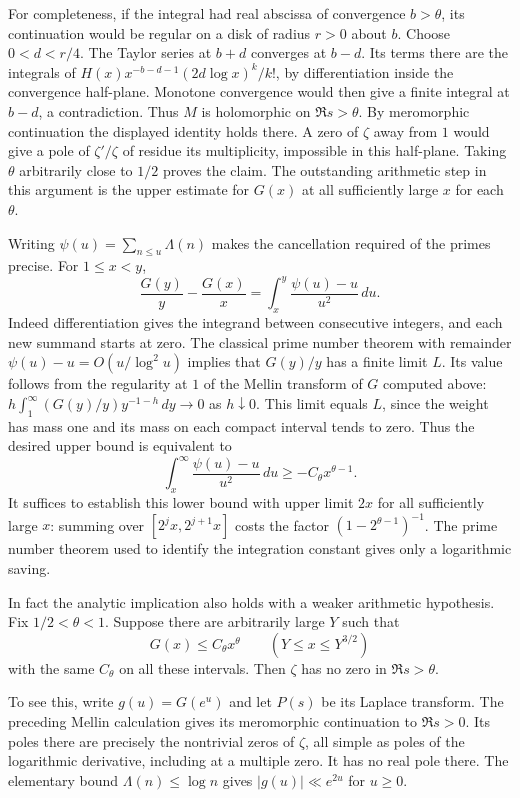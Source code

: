 \documentclass[11pt]{amsart}
\theoremstyle{definition}
\theoremstyle{remark}
\begin{document}
For completeness, if the integral had real abscissa of convergence
$b>\theta$, its continuation would be regular on a disk of radius
$r>0$ about $b$. Choose $0<d<r/4$. The Taylor series at $b+d$
converges at $b-d$. Its terms there are the integrals of
$H(x)x^{-b-d-1}(2d\log x)^k/k!$, by differentiation inside the
convergence half-plane. Monotone convergence would then give a finite
integral at $b-d$, a contradiction. Thus $M$ is holomorphic on
$\Re s>\theta$. By meromorphic continuation the displayed identity
holds there. A zero of $\zeta$ away from $1$ would give a pole of
$\zeta'/\zeta$ of residue its multiplicity, impossible in this
half-plane. Taking $\theta$ arbitrarily close to $1/2$ proves the claim.
The outstanding arithmetic step in this argument is the upper estimate
for $G(x)$ at all sufficiently large $x$ for each $\theta$.


Writing $\psi(u)=\sum_{n\le u}\Lambda(n)$ makes the cancellation
required of the primes precise. For $1\le x<y$,
\[
 \frac{G(y)}y-\frac{G(x)}x=\int_x^y\frac{\psi(u)-u}{u^2}\,du .
\]
Indeed differentiation gives the integrand between consecutive
integers, and each new summand starts at zero. The classical prime
number theorem with remainder $\psi(u)-u=O(u/\log^2 u)$ implies
that $G(y)/y$ has a finite limit $L$. Its value follows from the
regularity at $1$ of the Mellin transform of $G$ computed above:
$h\int_1^\infty (G(y)/y)y^{-1-h}\,dy\to0$ as $h\downarrow0$.
This limit equals $L$, since the weight has mass one and its mass on
each compact interval tends to zero. Thus the desired upper bound
is equivalent to
\[
 \int_x^\infty\frac{\psi(u)-u}{u^2}\,du\ge -C_\theta x^{\theta-1}.
\]
It suffices to establish this lower bound with upper limit $2x$ for
all sufficiently large $x$: summing over $[2^jx,2^{j+1}x]$ costs
the factor $(1-2^{\theta-1})^{-1}$. The prime number theorem used
to identify the integration constant gives only a logarithmic saving.

In fact the analytic implication also holds with a weaker arithmetic
hypothesis. Fix $1/2<\theta<1$. Suppose there are arbitrarily large $Y$
such that
\[
 G(x)\le C_\theta x^\theta\qquad(Y\le x\le Y^{3/2})
\]
with the same $C_\theta$ on all these intervals. Then $\zeta$ has no
zero in $\Re s>\theta$.

To see this, write $g(u)=G(e^u)$ and let $P(s)$ be its Laplace
transform. The preceding Mellin calculation gives its meromorphic
continuation to $\Re s>0$. Its poles there are precisely the nontrivial
zeros of $\zeta$, all simple as poles of the logarithmic derivative,
including at a multiple zero. It has no real pole there. The elementary
bound $\Lambda(n)\le\log n$ gives $|g(u)|\ll e^{2u}$ for $u\ge0$.
\end{document}
